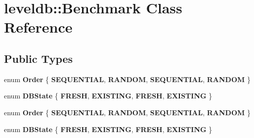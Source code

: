 \hypertarget{classleveldb_1_1_benchmark}{}\section{leveldb\+:\+:Benchmark Class Reference}
\label{classleveldb_1_1_benchmark}
\subsection*{Public Types}
\begin{DoxyCompactItemize}
\item 
\mbox{\label{classleveldb_1_1_benchmark_a4694fe0f2fd06d7da386305a339ddbc4}} 
enum {\bfseries Order} \{ {\bfseries S\+E\+Q\+U\+E\+N\+T\+I\+AL}, 
{\bfseries R\+A\+N\+D\+OM}, 
{\bfseries S\+E\+Q\+U\+E\+N\+T\+I\+AL}, 
{\bfseries R\+A\+N\+D\+OM}
 \}
\item 
\mbox{\label{classleveldb_1_1_benchmark_ad94bd817d74359a4d8cea6da609a28d4}} 
enum {\bfseries D\+B\+State} \{ {\bfseries F\+R\+E\+SH}, 
{\bfseries E\+X\+I\+S\+T\+I\+NG}, 
{\bfseries F\+R\+E\+SH}, 
{\bfseries E\+X\+I\+S\+T\+I\+NG}
 \}
\item 
\mbox{\label{classleveldb_1_1_benchmark_a4694fe0f2fd06d7da386305a339ddbc4}} 
enum {\bfseries Order} \{ {\bfseries S\+E\+Q\+U\+E\+N\+T\+I\+AL}, 
{\bfseries R\+A\+N\+D\+OM}, 
{\bfseries S\+E\+Q\+U\+E\+N\+T\+I\+AL}, 
{\bfseries R\+A\+N\+D\+OM}
 \}
\item 
\mbox{\label{classleveldb_1_1_benchmark_ad94bd817d74359a4d8cea6da609a28d4}} 
enum {\bfseries D\+B\+State} \{ {\bfseries F\+R\+E\+SH}, 
{\bfseries E\+X\+I\+S\+T\+I\+NG}, 
{\bfseries F\+R\+E\+SH}, 
{\bfseries E\+X\+I\+S\+T\+I\+NG}
 \}
\end{DoxyCompactItemize}

